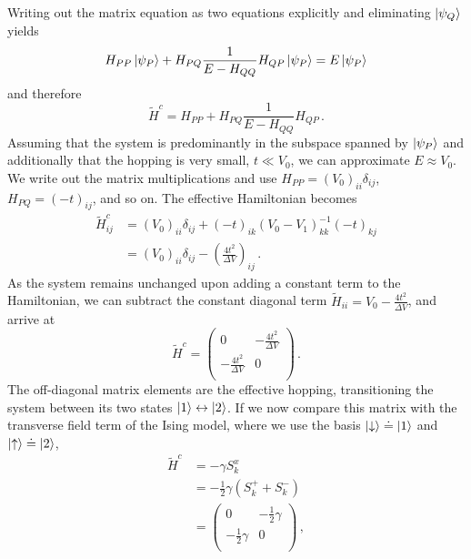 %
Writing out the matrix equation as two equations explicitly and eliminating
$\left|\psi_Q\right>$ yields 
%
\begin{equation}
  H_{PP} \left|\psi_P\right> + H_{PQ} \frac{1}{E - H_{QQ}} H_{QP} \left|\psi_P\right>
  =
  E \left|\psi_P\right>
\end{equation}
%
and therefore
%
\begin{equation}
  \label{eq:H_effective}
  \tilde{H}^c = H_{PP} + H_{PQ} \frac{1}{E - H_{QQ}} H_{QP} \, .
\end{equation}
%
Assuming that the system is predominantly in the subspace spanned by
$\left|\psi_P\right>$ and additionally that the hopping is very small, $t \ll V_0$, we
can approximate $E \approx V_0$. We write out the matrix multiplications and use
$H_{PP} = \left( V_0 \right)_{ii} \delta_{ij}$, $H_{PQ} = \left( -t
\right)_{ij}$, and so on. The effective Hamiltonian becomes
%
\begin{equation}
\begin{split}
  \tilde{H}^c_{ij}
  &=
  \left( V_0 \right)_{ii} \delta_{ij}
  + \left( - t \right)_{ik}
    \left( V_0 - V_1 \right)^{-1}_{kk}
    \left( - t \right)_{kj} \\
  &=
  \left( V_0 \right)_{ii} \delta_{ij}
  - \left( \frac{4 t^2}{\Delta V} \right)_{ij} \, .
\end{split}
\end{equation}
%
As the system remains unchanged upon adding a constant term to the Hamiltonian,
we can subtract the constant diagonal term $\tilde{H}_{ii} = V_0 - \frac{4
t^2}{\Delta V}$, and arrive at
%
\begin{equation}
  \tilde{H}^c
  =
  \begin{pmatrix}
    0 & - \frac{4 t^2}{\Delta V} \\
    - \frac{4 t^2}{\Delta V} & 0 \\
  \end{pmatrix} \, .
\end{equation}
%
The off-diagonal matrix elements are the effective hopping, transitioning the
system between its two states $\left|1\right> \leftrightarrow \left|2\right>$. If we now
compare this matrix with the transverse field term of the Ising model, where we
use the basis $\left|\downarrow\right> \doteq \left|1\right>$ and $\left|\uparrow\right> \doteq
\left|2\right>$, 
%
\begin{equation}
\begin{split}
  \tilde{H}^c
  &=
  - \gamma S^x_k \\
  &=
  - \frac{1}{2} \gamma \left( S^+_k + S^-_k \right) \\[0.5em]
  &= 
  \begin{pmatrix}
    0 & - \frac{1}{2} \gamma \\
    - \frac{1}{2} \gamma & 0 \\
  \end{pmatrix} \, ,
\end{split}
\end{equation}

